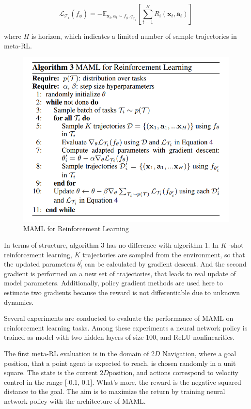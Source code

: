  $$\mathcal{L}_{\mathcal{T}_{i}}\left(f_{\phi}\right)=-\mathbb{E}_{\mathbf{x}_{t}, \mathbf{a}_{t} \sim f_{\phi}, q_{\mathcal{T}_{i}}}\left[\sum_{t=1}^{H} R_{i}\left(\mathbf{x}_{t}, \mathbf{a}_{t}\right)\right]
 $$
 
 where ${H}$ is horizon, which indicates  a limited number of sample trajectories in meta-RL.
 \begin{figure}[H]
	\includegraphics[scale=0.6]{MAML_03.PNG}
	\centering
	\caption{MAML for Reinforcement Learning
}
	\label{MAML}
\end{figure}
In terms of structure, algorithm 3 has no difference with algorithm 1. 
In $K$ -shot reinforcement learning, $K$ trajectories are sampled from the environment, so that the updated parameters $\theta_{i}^{\prime}$ can be calculated by gradient descent. And the second gradient is performed on a new set of trajectories, that leads to real update of model parameters. Additionally, policy gradient methods are used here to estimate two gradients because the reward is not differentiable due to unknown dynamics. 

Several experiments are conducted to evaluate the performance of MAML on reinforcement learning tasks. Among these experiments a neural network policy is trained as model with  two hidden layers of size 100, and ReLU nonlinearities. %

The first meta-RL evaluation is in the domain of 2$D$ Navigation, where  a goal position, that a point agent is expected to reach, is chosen randomly in a unit square. The state is the current 2$D$position, and actions correspond to velocity control in the range [-0.1, 0.1]. What's more, the reward is the negative squared distance to the goal. The aim is to maximize the return by training neural network policy with the architecture of MAML.

